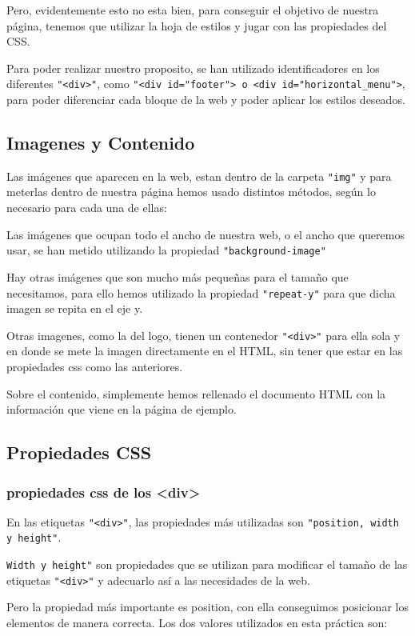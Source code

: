\documentclass[10pt,a4paper]{article}
\begin{document}
Pero, evidentemente esto no esta bien, para conseguir el objetivo de nuestra página, tenemos que utilizar la hoja de estilos y jugar con las propiedades del CSS.

Para poder realizar nuestro proposito, se han utilizado identificadores en los diferentes \texttt{"<div>"}, como \texttt{"<div id="footer"> o <div id="horizontal\_menu">}, para poder diferenciar cada bloque de la web y poder aplicar los estilos deseados.


\subsection{Imagenes y Contenido}

Las imágenes que aparecen en la web, estan dentro de la carpeta \texttt{"img"} y para meterlas dentro de nuestra página hemos usado distintos métodos, según lo necesario para cada una de ellas:

Las imágenes que ocupan todo el ancho de nuestra web, o el ancho que queremos usar, se han metido utilizando la propiedad \texttt{"background-image"}

Hay otras imágenes que son mucho más pequeñas para el tamaño que necesitamos, para ello hemos utilizado la propiedad \texttt{"repeat-y"} para que dicha imagen se repita en el eje y.

Otras imagenes, como la del logo, tienen un contenedor \texttt{"<div>"} para ella sola y en donde se mete la imagen directamente en el HTML, sin tener que estar en las propiedades css como las anteriores. 

Sobre el contenido, simplemente hemos rellenado el documento HTML con la información que viene en la página de ejemplo. 

\subsection{Propiedades CSS}

\subsubsection{propiedades css de los <div>}
En las etiquetas \texttt{"<div>"}, las propiedades más utilizadas son \texttt{"position, width y height"}.

\texttt{Width y height"} son propiedades que se utilizan para modificar el tamaño de las etiquetas \texttt{"<div>"} y adecuarlo así a las necesidades de la web.

Pero la propiedad más importante es position, con ella conseguimos posicionar los elementos de manera correcta. Los dos valores utilizados en esta práctica son:
\end{document}
